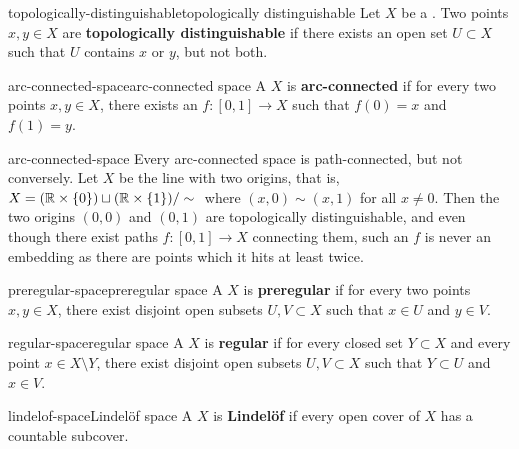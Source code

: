 \begin{topic}{topologically-distinguishable}{topologically distinguishable}
    Let $X$ be a . Two points $x, y \in X$ are \textbf{topologically distinguishable} if there exists an open set $U \subset X$ such that $U$ contains $x$ or $y$, but not both.
\end{topic}

\begin{topic}{arc-connected-space}{arc-connected space}
    A  $X$ is \textbf{arc-connected} if for every two  points $x, y \in X$, there exists an  $f \colon [0, 1] \to X$ such that $f(0) = x$ and $f(1) = y$.
\end{topic}

\begin{example}{arc-connected-space}
    Every arc-connected space is path-connected, but not conversely. Let $X$ be the line with two origins, that is, $X = (\mathbb{R} \times \{ 0 \}) \sqcup (\mathbb{R} \times \{ 1 \}) / \sim{}$ where $(x, 0) \sim{} (x, 1)$ for all $x \ne 0$. Then the two origins $(0, 0)$ and $(0, 1)$ are topologically distinguishable, and even though there exist paths $f \colon [0, 1] \to X$ connecting them, such an $f$ is never an embedding as there are points which it hits at least twice.
\end{example}

\begin{topic}{preregular-space}{preregular space}
    A  $X$ is \textbf{preregular} if for every two  points $x, y \in X$, there exist disjoint open subsets $U, V \subset X$ such that $x \in U$ and $y \in V$.
\end{topic}

\begin{topic}{regular-space}{regular space}
    A  $X$ is \textbf{regular} if for every closed set $Y \subset X$ and every point $x \in X \setminus Y$, there exist disjoint open subsets $U, V \subset X$ such that $Y \subset U$ and $x \in V$.
\end{topic}

\begin{topic}{lindelof-space}{Lindelöf space}
    A  $X$ is \textbf{Lindelöf} if every open cover of $X$ has a countable subcover.
\end{topic}


